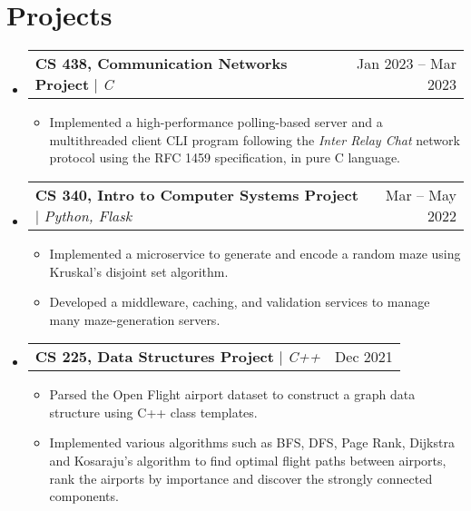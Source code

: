\documentclass[letterpaper,11pt]{article}
\makeatletter
\newcommand{\resumeItem}[1]{
  \item\small{
    {#1 \vspace{-2pt}}
  }
}
\newcommand{\resumeProjectHeading}[2]{
    \item
    \begin{tabular*}{0.97\textwidth}{l@{\extracolsep{\fill}}r}
      \small#1 & #2 \\
    \end{tabular*}\vspace{-7pt}
}
\newcommand{\resumeSubHeadingListStart}{\begin{itemize}[leftmargin=0.15in, label={}]}
\newcommand{\resumeSubHeadingListEnd}{\end{itemize}}
\newcommand{\resumeItemListStart}{\begin{itemize}}
\newcommand{\resumeItemListEnd}{\end{itemize}\vspace{-5pt}}
\makeatother
\begin{document}
\section{Projects}
    \resumeSubHeadingListStart

    \resumeProjectHeading
    {\textbf{CS 438, Communication Networks Project} $|$ \emph{C}}{Jan 2023 -- Mar 2023}
    \resumeItemListStart
    \resumeItem{Implemented a high-performance polling-based 
    server and a multithreaded client CLI program following the \emph{Inter Relay Chat} network protocol 
    using the RFC 1459 specification, in pure C language.}
    \resumeItemListEnd

    \resumeProjectHeading
    {\textbf{CS 340, Intro to Computer Systems Project} $|$ \emph{Python, Flask}}{Mar -- May 2022}
    \resumeItemListStart
    \resumeItem{Implemented a microservice to generate and encode a random maze using Kruskal’s disjoint set algorithm.}
    \resumeItem{Developed a middleware, caching, and validation services to manage many maze-generation servers.}
    \resumeItemListEnd

    \resumeProjectHeading
    {\textbf{CS 225, Data Structures Project} $|$ \emph{C++}}{Dec 2021}
    \resumeItemListStart
    \resumeItem{Parsed the Open Flight airport dataset to construct a graph data structure using C++ class templates.}
    \resumeItem{Implemented various algorithms such as BFS, DFS, Page Rank, Dijkstra and Kosaraju’s algorithm to find optimal
    flight paths between airports, rank the airports by importance and discover the strongly connected components.}
    \resumeItemListEnd

    \resumeSubHeadingListEnd


\end{document}
